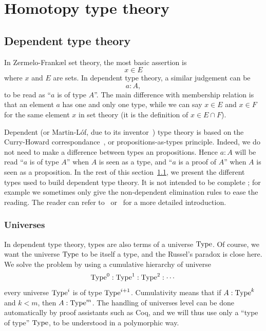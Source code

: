 \chapter{Homotopy type theory}
\label{chap:hott}


\section{Dependent type theory}
\label{sec:mltt}

In Zermelo-Frank\ae l set theory, the most basic assertion is
\[ x\in E\]
where $x$ and $E$ are sets. 
In dependent type theory, a similar judgement can be
\[a:A, \]
to be read as ``$a$ is of type $A$''. The main difference with
membership relation is that an element $a$ has one and only one type,
while we can say $x\in E$ and $x\in F$ for the same element $x$ in set
theory (it is the definition of $x\in E\cap F$).

Dependent (or Martin-L\'of, due to its inventor~\cite{mltt}) type
theory is based on the Curry-Howard correspondance~\cite{Howard80}, or
propositions-as-types principle. Indeed, we do not need to make a
difference between types an propositions. Hence $a:A$ will be read
``$a$ is of type $A$'' when $A$ is seen as a type, and ``$a$ is a
proof of $A$'' when $A$ is seen as a proposition. In the rest of this
section~\ref{sec:mltt}, we present the different types used to build
dependent type theory. It is not intended to be complete ; for example
we sometimes only give the non-dependent elimination rules to ease the
reading. The reader
can refer to~\cite{nordstrom2001martin} or~\cite{hottbook} for a more
detailed introduction.


\subsection{Universes}
\label{ssec:universes}
In dependent type theory, types are also terms of a universe
$\operatorname{Type}$. Of course, we want the universe $\operatorname{Type}$ to be itself a type,
and the Russel's paradox is close here.
We solve the problem by using a cumulative hierarchy of universe
\[ \operatorname{Type}^0 : \operatorname{Type}^1 : \operatorname{Type}^2 :\cdots \]
every universe $\operatorname{Type}^i$ is of type $\operatorname{Type}^{i+1}$. Cumulativity means
that if $A:\operatorname{Type}^k$ and $k<m$, then $A:\operatorname{Type}^m$. The handling of
universes level can be done automatically by proof assistants such as Coq,
and we will thus use only a ``type of type'' $\operatorname{Type}$, to be understood
in a polymorphic way.

